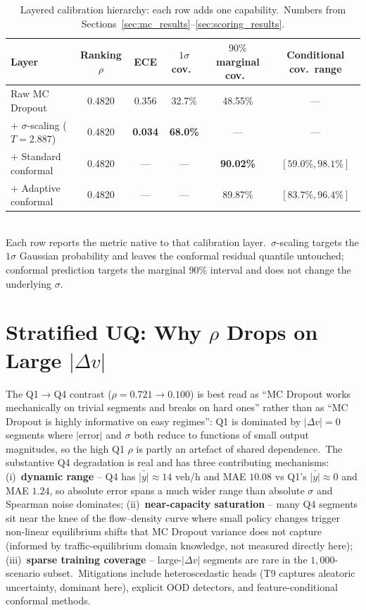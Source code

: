 \begin{table}[htbp]
\centering
\caption[Layered calibration hierarchy]{Layered calibration hierarchy: each row adds one capability.\ Numbers from Sections~\ref{sec:mc_results}--\ref{sec:scoring_results}.}
\label{tab:calibration_hierarchy}
\footnotesize
\setlength{\tabcolsep}{4pt}
\begin{tabular}{lccccc}
\toprule
Layer & Ranking $\rho$ & ECE & $1\sigma$ cov.\ & $90\%$ marginal cov.\ & Conditional cov.\ range \\
\midrule
Raw MC Dropout & 0.4820 & 0.356 & 32.7\% & 48.55\% & --- \\
$+$ $\sigma$-scaling ($T = 2.887$) & 0.4820 & \textbf{0.034} & \textbf{68.0\%} & --- & --- \\
$+$ Standard conformal & 0.4820 & --- & --- & \textbf{90.02\%} & $[59.0\%, 98.1\%]$ \\
$+$ Adaptive conformal & 0.4820 & --- & --- & 89.87\% & $\mathbf{[83.7\%, 96.4\%]}$ \\
\bottomrule
\end{tabular}
\\[0.3em]
\footnotesize Each row reports the metric native to that calibration layer.\ $\sigma$-scaling targets the $1\sigma$ Gaussian probability and leaves the conformal residual quantile untouched; conformal prediction targets the marginal $90\%$ interval and does not change the underlying $\sigma$.
\end{table}

\section{Stratified UQ: Why \texorpdfstring{$\rho$}{ρ} Drops on Large \texorpdfstring{$|\Delta v|$}{|Δv|}}\label{sec:stratified_why}

The Q1$\to$Q4 contrast ($\rho = 0.721 \to 0.100$) is best read as ``MC Dropout works mechanically on trivial segments and breaks on hard ones'' rather than as ``MC Dropout is highly informative on easy regimes'': Q1 is dominated by $|\Delta v| = 0$ segments where $|\text{error}|$ and $\sigma$ both reduce to functions of small output magnitudes, so the high Q1 $\rho$ is partly an artefact of shared dependence.\ The substantive Q4 degradation is real and has three contributing mechanisms: (i)~\textbf{dynamic range} -- Q4 has $\bar{|y|} \approx 14$ veh/h and MAE $10.08$ vs Q1's $\bar{|y|} \approx 0$ and MAE $1.24$, so absolute error spans a much wider range than absolute $\sigma$ and Spearman noise dominates; (ii)~\textbf{near-capacity saturation} -- many Q4 segments sit near the knee of the flow--density curve where small policy changes trigger non-linear equilibrium shifts that MC Dropout variance does not capture (informed by traffic-equilibrium domain knowledge, not measured directly here); (iii)~\textbf{sparse training coverage} -- large-$|\Delta v|$ segments are rare in the $1{,}000$-scenario subset.\ Mitigations include heteroscedastic heads (T9 captures aleatoric uncertainty, dominant here), explicit OOD detectors, and feature-conditional conformal methods.

